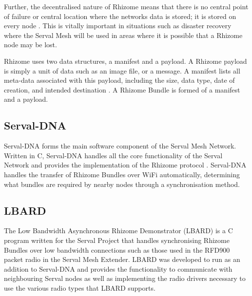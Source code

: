 Further, the decentralised nature of Rhizome means that there is no central point of failure or central location where the networks data is stored; it is stored on every node \parencite{servalWiFiMultiModel}.
This is vitally important in situations such as disaster recovery where the Serval Mesh will be used in areas where it is possible that a Rhizome node may be lost.

Rhizome uses two data structures, a manifest and a payload.
A Rhizome payload is simply a unit of data such as an image file, or a message.
A manifest lists all meta-data associated with this payload, including the size, data type, date of creation, and intended destination \parencite{servalProject2011}.
A Rhizome Bundle is formed of a manifest and a payload. 

\subsection{Serval-DNA}
Serval-DNA forms the main software component of the Serval Mesh Network.
Written in C, Serval-DNA handles all the core functionality of the Serval Network and provides the implementation of the Rhizome protocol \parencite{servalMesh2013}. 
Serval-DNA handles the transfer of Rhizome Bundles over WiFi automatically, determining what bundles are required by nearby nodes through a synchronisation method.

\subsection{LBARD}
The Low Bandwidth Asynchronous Rhizome Demonstrator (LBARD) is a C program written for the Serval Project that handles synchronising Rhizome Bundles over low bandwidth connections such as those used in the RFD900 packet radio in the Serval Mesh Extender.
LBARD was developed to run as an addition to Serval-DNA and provides the functionality to communicate with neighbouring Serval nodes as well as implementing the radio drivers necessary to use the various radio types that LBARD supports.

